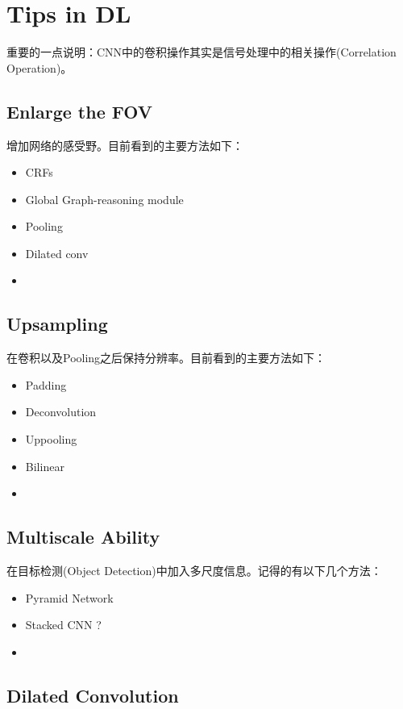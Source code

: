 \chapter{Tips in DL}

重要的一点说明：CNN中的卷积操作其实是信号处理中的相关操作(Correlation Operation)。

\section{Enlarge the FOV}

增加网络的感受野。目前看到的主要方法如下：

\begin{itemize}
\item CRFs\cite{marvin2018crf}
\item Global Graph-reasoning module\cite{chen18iterative}
\item Pooling
\item Dilated conv\cite{YuKoltun2016}
\item 
\end{itemize}


\section{Upsampling}

在卷积以及Pooling之后保持分辨率。目前看到的主要方法如下：

\begin{itemize}
\item Padding
\item Deconvolution
\item Uppooling
\item Bilinear
\item 
\end{itemize}


\section{Multiscale Ability}

在目标检测(Object Detection)中加入多尺度信息。记得的有以下几个方法：

\begin{itemize}
\item Pyramid Network
\item Stacked CNN ?
\item 
\end{itemize}


\section{Dilated Convolution}

